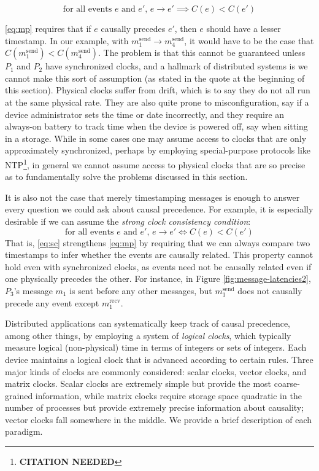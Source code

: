 \documentclass[]             %
{NASA}                       %
\theoremstyle{definition}
\newcommand{\citationneeded}{\footnote{\textbf{CITATION NEEDED}}}
\begin{document}
\[ \textrm{for all events $e$ and $e'$, } e \to e' \implies C(e) < C(e') \label{eq:mp}\tag{MP} \]

\ref{eq:mp} requires that if $e$ causally precedes $e'$, then $e$
should have a lesser timestamp. In our example, with
$m_1^\textrm{send} \to m_4^\textrm{send}$, it would have to be the
case that $C(m_1^\textrm{send}) < C(m_4^\textrm{send})$. The problem
is that this cannot be guaranteed unless $P_1$ and $P_2$ have
synchronized clocks, and a hallmark of distributed systems is we
cannot make this sort of assumption (as stated in the quote at the
beginning of this section).  Physical clocks suffer from drift, which
is to say they do not all run at the same physical rate. They are also
quite prone to misconfiguration, say if a device administrator sets
the time or date incorrectly, and they require an always-on battery to
track time when the device is powered off, say when sitting in a
storage. While in some cases one may assume access to clocks that are
only approximately synchronized, perhaps by employing special-purpose
protocols like NTP\citationneeded, in general we cannot assume access
to physical clocks that are so precise as to fundamentally solve the
problems discussed in this section.

It is also not the case that merely timestamping messages is enough to
answer every question we could ask about causal precedence. For
example, it is especially desirable if we can assume the \emph{strong
clock consistency condition}:
\[ \textrm{for all events $e$ and $e'$, } e \to e' \iff C(e) < C(e') \label{eq:sc}\tag{SC} \]
That is, \ref{eq:sc} strengthens \ref{eq:mp} by requiring that we can
always compare two timestamps to infer whether the events are causally
related. This property cannot hold even with synchronized clocks, as
events need not be causally related even if one physically precedes
the other. For instance, in Figure \ref{fig:message-latencies2},
$P_3$'s message $m_1$ is sent before any other messages, but
$m_1^\textrm{send}$ does not causally precede any event except
$m_1^\textrm{recv}$.

Distributed applications can systematically keep track of causal
precedence, among other things, by employing a system of \emph{logical
clocks}, which typically measure logical (non-physical) time in terms
of integers or sets of integers. Each device maintains a logical clock
that is advanced according to certain rules. Three major kinds of
clocks are commonly considered: scalar clocks, vector clocks, and
matrix clocks. Scalar clocks are extremely simple but provide the most
coarse-grained information, while matrix clocks require storage space
quadratic in the number of processes but provide extremely precise
information about causality; vector clocks fall somewhere in the
middle. We provide a brief description of each paradigm.
\end{document}
